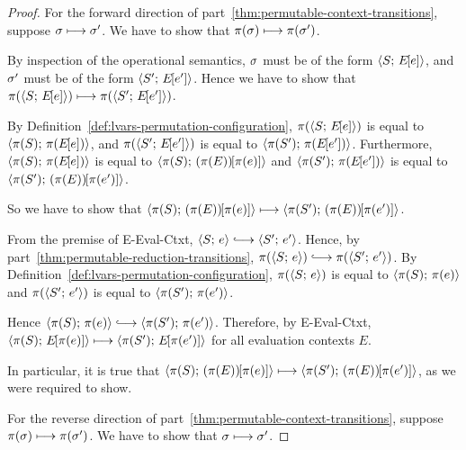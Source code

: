 \begin{proof}

  For the forward direction of
  part~\ref{thm:permutable-context-transitions}, suppose $\sigma
  \longmapsto \sigma'$.  We have to show that $\pi(\sigma) \longmapsto
  \pi(\sigma')$.

  By inspection of the operational semantics, $\sigma$ must be of the
  form $\langle S;\, E\hspace{-1mm}\left[e\right] \rangle$, and $\sigma'$ must be of the form
  $\langle S';\, E\hspace{-1mm}\left[e'\right] \rangle$.  Hence we have to show that
  $\pi(\langle S;\, E\hspace{-1mm}\left[e\right] \rangle) \longmapsto \pi(\langle S';\, E\hspace{-1mm}\left[e'\right] \rangle)$.

  By Definition~\ref{def:lvars-permutation-configuration},
  $\pi(\langle S;\, E\hspace{-1mm}\left[e\right] \rangle)$ is equal to $\langle \pi(S);\, \pi(E\hspace{-1mm}\left[e\right]) \rangle$,
  and $\pi(\langle S';\, E\hspace{-1mm}\left[e'\right] \rangle)$ is equal to
  $\langle \pi(S');\, \pi(E\hspace{-1mm}\left[e'\right]) \rangle$.  Furthermore,
  $\langle \pi(S);\, \pi(E\hspace{-1mm}\left[e\right]) \rangle$ is equal to
  $\langle \pi(S);\, (\pi(E))\hspace{-1mm}\left[\pi(e)\right] \rangle$ and
  $\langle \pi(S');\, \pi(E\hspace{-1mm}\left[e'\right]) \rangle$ is equal to
  $\langle \pi(S');\, (\pi(E))\hspace{-1mm}\left[\pi(e')\right] \rangle$.

  So we have to show that
  $\langle \pi(S);\, (\pi(E))\hspace{-1mm}\left[\pi(e)\right] \rangle \longmapsto
  \langle \pi(S');\, (\pi(E))\hspace{-1mm}\left[\pi(e')\right] \rangle$.

  From the premise of {\sc E-Eval-Ctxt}, $\config{S}{e} \parstepsto
  \config{S'}{e'}$.  Hence, by
  part~\ref{thm:permutable-reduction-transitions}, $\pi(\config{S}{e})
  \parstepsto \pi(\config{S'}{e'})$.  By
  Definition~\ref{def:lvars-permutation-configuration},
  $\pi(\langle S;\, e \rangle)$ is equal to $\langle \pi(S);\, \pi(e) \rangle$ and
  $\pi(\langle S';\, e' \rangle)$ is equal to $\langle \pi(S');\, \pi(e') \rangle$.

  Hence $\config{\pi(S)}{\pi(e)} \parstepsto
  \config{\pi(S')}{\pi(e')}$.  Therefore, by {\sc E-Eval-Ctxt},
  $\langle \pi(S);\, E\hspace{-1mm}\left[\pi(e)\right] \rangle \longmapsto
  \langle \pi(S');\, E\hspace{-1mm}\left[\pi(e')\right] \rangle$ for all evaluation contexts $E$.

  In particular, it is true that
  $\langle \pi(S);\, (\pi(E))\hspace{-1mm}\left[\pi(e)\right] \rangle \longmapsto
  \langle \pi(S');\, (\pi(E))\hspace{-1mm}\left[\pi(e')\right] \rangle$, as we were required
  to show.

  For the reverse direction of
  part~\ref{thm:permutable-context-transitions}, suppose $\pi(\sigma)
  \longmapsto \pi(\sigma')$.  We have to show that $\sigma \longmapsto
  \sigma'$.

\end{proof}

